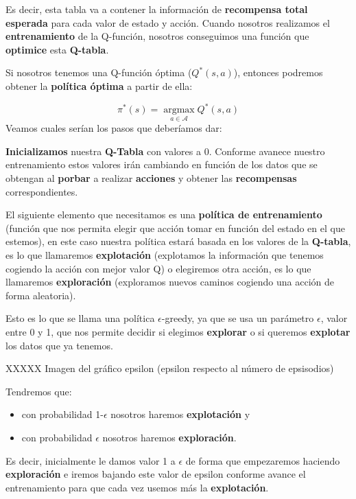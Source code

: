 \documentclass[
  a4paper,
  DIV=11,
  numbers=noendperiod]{scrreprt}
\providecommand{\tightlist}{%
  \setlength{\itemsep}{0pt}\setlength{\parskip}{0pt}}\usepackage{longtable,booktabs,array}
\begin{document}
Es decir, esta tabla va a contener la información de \textbf{recompensa
total esperada} para cada valor de estado y acción. Cuando nosotros
realizamos el \textbf{entrenamiento} de la Q-función, nosotros
conseguimos una función que \textbf{optimice} esta \textbf{Q-tabla}.

Si nosotros tenemos una Q-función óptima (\(Q^*(s,a)\)), entonces
podremos obtener la \textbf{política óptima} a partir de ella:

\[
\pi^*(s) = \mathop{\mathrm{argmax}}\limits_{a \in \mathcal A}Q^*(s,a)
\] Veamos cuales serían los pasos que deberíamos dar:

\textbf{Inicializamos} nuestra \textbf{Q-Tabla} con valores a 0.
Conforme avanece nuestro entrenamiento estos valores irán cambiando en
función de los datos que se obtengan al \textbf{porbar} a realizar
\textbf{acciones} y obtener las \textbf{recompensas} correspondientes.

El siguiente elemento que necesitamos es una \textbf{política de
entrenamiento} (función que nos permita elegir que acción tomar en
función del estado en el que estemos), en este caso nuestra política
estará basada en los valores de la \textbf{Q-tabla}, es lo que
llamaremos \textbf{explotación} (explotamos la información que tenemos
cogiendo la acción con mejor valor Q) o elegiremos otra acción, es lo
que llamaremos \textbf{exploración} (exploramos nuevos caminos cogiendo
una acción de forma aleatoria).

Esto es lo que se llama una política \(\epsilon\)-greedy, ya que se usa
un parámetro \(\epsilon\), valor entre 0 y 1, que nos permite decidir si
elegimos \textbf{explorar} o si queremos \textbf{explotar} los datos que
ya tenemos.

XXXXX Imagen del gráfico epsilon (epsilon respecto al número de
epsisodios)

Tendremos que:

\begin{itemize}
\tightlist
\item
  con probabilidad 1-\(\epsilon\) nosotros haremos \textbf{explotación}
  y
\item
  con probabilidad \(\epsilon\) nosotros haremos \textbf{exploración}.
\end{itemize}

Es decir, inicialmente le damos valor 1 a \(\epsilon\) de forma que
empezaremos haciendo \textbf{exploración} e iremos bajando este valor de
epsilon conforme avance el entrenamiento para que cada vez usemos más la
\textbf{explotación}.
\end{document}
